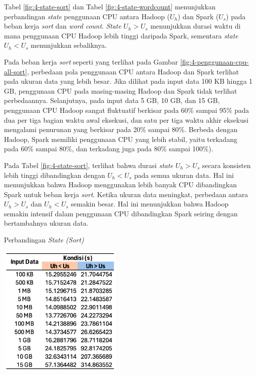 Tabel \ref{fig:4-state-sort} dan Tabel \ref{fig:4-state-wordcount} menunjukkan perbandingan \textit{state} penggunaan CPU antara Hadoop ($U_h$) dan Spark ($U_s$) pada beban kerja \textit{sort} dan \textit{word count}. \textit{State} $U_h > U_s$ menunjukkan durasi waktu di mana penggunaan CPU Hadoop lebih tinggi daripada Spark, sementara \textit{state} $U_h < U_s$ menunjukkan sebaliknya.

Pada beban kerja \textit{sort} seperti yang terlihat pada Gambar \ref{fig:4-penggunaan-cpu-all-sort}, perbedaan pola penggunaan CPU antara Hadoop dan Spark terlihat pada ukuran data yang lebih besar. Jika dilihat pada input data 100 KB hingga 1 GB, penggunaan CPU pada masing-masing Hadoop dan Spark tidak terlihat perbedaannya. Selanjutnya, pada input data 5 GB, 10 GB, dan 15 GB, penggunaan CPU Hadoop sangat fluktuatif berkisar pada 60\% sampai 95\% pada dua per tiga bagian waktu awal eksekusi, dan satu per tiga waktu akhir eksekusi mengalami penurunan yang berkisar pada 20\% sampai 80\%. Berbeda dengan Hadoop, Spark memiliki penggunaan CPU yang lebih stabil, yaitu terkadang pada 60\% sampai 80\%, dan terkadang juga pada 80\% sampai 100\%).

Pada Tabel \ref{fig:4-state-sort}, terlihat bahwa durasi \textit{state} $U_h > U_s$ secara konsisten lebih tinggi dibandingkan dengan $U_h < U_s$ pada semua ukuran data. Hal ini menunjukkan bahwa Hadoop menggunakan lebih banyak CPU dibandingkan Spark untuk beban kerja \textit{sort}. Ketika ukuran data meningkat, perbedaan antara $U_h > U_s$ dan $U_h < U_s$ semakin besar. Hal ini menunjukkan bahwa Hadoop semakin intensif dalam penggunaan CPU dibandingkan Spark seiring dengan bertambahnya ukuran data.

\begin{table}[h]
  \centering
  \caption{Perbandingan \textit{State (Sort)}}
  \includegraphics[width=0.45\textwidth]{figures/ch04/4-kondisi-sort}
  \label{fig:4-state-sort}
\end{table}

